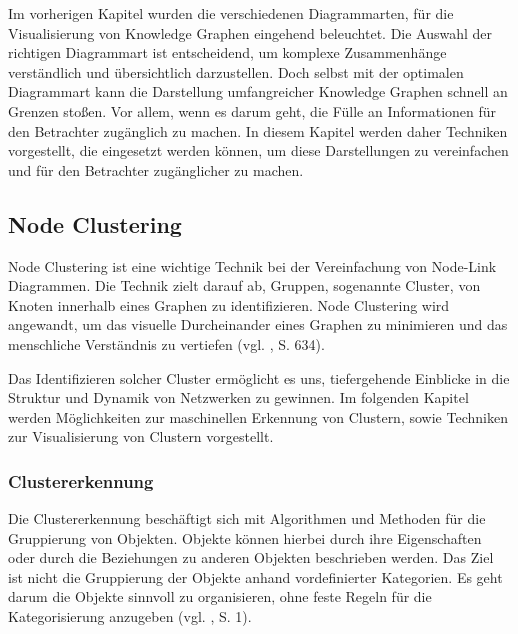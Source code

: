 Im vorherigen Kapitel wurden die verschiedenen Diagrammarten, für die Visualisierung von Knowledge Graphen eingehend beleuchtet. Die Auswahl der richtigen Diagrammart ist entscheidend, um komplexe Zusammenhänge verständlich und übersichtlich darzustellen. Doch selbst mit der optimalen Diagrammart kann die Darstellung umfangreicher Knowledge Graphen schnell an Grenzen stoßen. Vor allem, wenn es darum geht, die Fülle an Informationen für den Betrachter zugänglich zu machen. In diesem Kapitel werden daher Techniken vorgestellt, die eingesetzt werden können, um diese Darstellungen zu vereinfachen und für den Betrachter zugänglicher zu machen.

\subsection{Node Clustering}

Node Clustering ist eine wichtige Technik bei der Vereinfachung von Node-Link Diagrammen. Die Technik zielt darauf ab, Gruppen, sogenannte Cluster, von Knoten innerhalb eines Graphen zu identifizieren. Node Clustering wird angewandt, um das visuelle Durcheinander eines Graphen zu minimieren und das menschliche Verständnis zu vertiefen (vgl. \cite{chen:SurveyGraphVisualization}, S. 634).

Das Identifizieren solcher Cluster ermöglicht es uns, tiefergehende Einblicke in die Struktur und Dynamik von Netzwerken zu gewinnen. Im folgenden Kapitel werden Möglichkeiten zur maschinellen Erkennung von Clustern, sowie Techniken zur Visualisierung von Clustern vorgestellt.

\subsubsection{Clustererkennung}

Die Clustererkennung beschäftigt sich mit Algorithmen und Methoden für die Gruppierung von Objekten. Objekte können hierbei durch ihre Eigenschaften oder durch die Beziehungen zu anderen Objekten beschrieben werden. Das Ziel ist nicht die Gruppierung der Objekte anhand vordefinierter Kategorien. Es geht darum die Objekte sinnvoll zu organisieren, ohne feste Regeln für die Kategorisierung anzugeben (vgl. \cite{clustering:AlgosForClust}, S. 1). 

